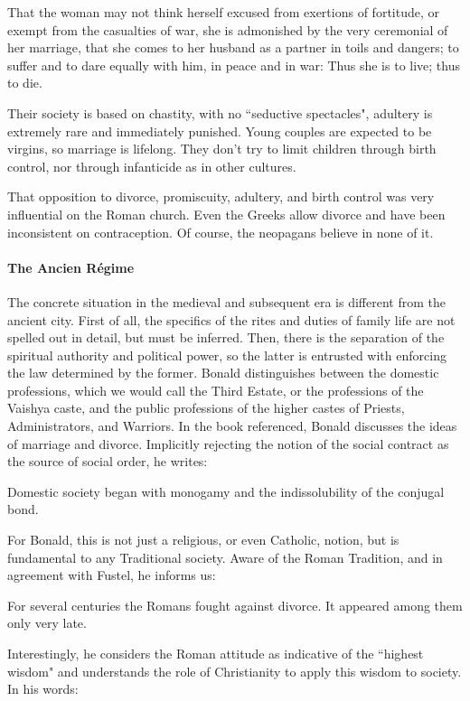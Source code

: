 \begin{quotex}
That the woman may not think herself excused from exertions of fortitude, or exempt from the casualties of war, she is admonished by the very ceremonial of her marriage, that she comes to her husband as a partner in toils and dangers; to suffer and to dare equally with him, in peace and in war: Thus she is to live; thus to die. 

\end{quotex}
Their society is based on chastity, with no ``seductive spectacles", adultery is extremely rare and immediately punished. Young couples are expected to be virgins, so marriage is lifelong. They don't try to limit children through birth control, nor through infanticide as in other cultures.

That opposition to divorce, promiscuity, adultery, and birth control was very influential on the Roman church. Even the Greeks allow divorce and have been inconsistent on contraception. Of course, the neopagans believe in none of it.

\paragraph{The Ancien Régime}
The concrete situation in the medieval and subsequent era is different from the ancient city. First of all, the specifics of the rites and duties of family life are not spelled out in detail, but must be inferred. Then, there is the separation of the spiritual authority and political power, so the latter is entrusted with enforcing the law determined by the former. Bonald distinguishes between the domestic professions, which we would call the Third Estate, or the professions of the Vaishya caste, and the public professions of the higher castes of Priests, Administrators, and Warriors. In the book referenced, Bonald discusses the ideas of marriage and divorce. Implicitly rejecting the notion of the social contract as the source of social order, he writes:

\begin{quotex}
Domestic society began with monogamy and the indissolubility of the conjugal bond. 

\end{quotex}
For Bonald, this is not just a religious, or even Catholic, notion, but is fundamental to any Traditional society. Aware of the Roman Tradition, and in agreement with Fustel, he informs us:

\begin{quotex}
For several centuries the Romans fought against divorce. It appeared among them only very late. 

\end{quotex}
Interestingly, he considers the Roman attitude as indicative of the ``highest wisdom" and understands the role of Christianity to apply this wisdom to society. In his words:

